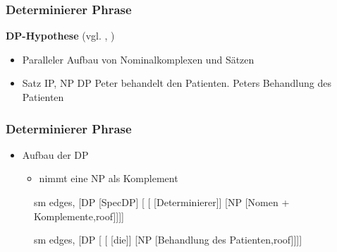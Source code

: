 
\begin{frame}
\frametitle{Determinierer Phrase}

\textbf{DP-Hypothese} (vgl. \citet{Abney87a}, \citet{Brame82a})
		\begin{itemize}
			\item Paralleler Aufbau von Nominalkomplexen und Sätzen
			\item Satz \ras IP, NP \ras DP
			\eal
			\ex Peter behandelt den Patienten.
			\ex Peters Behandlung des Patienten
			\zl
			
		\end{itemize}

\end{frame}


\begin{frame}
\frametitle{Determinierer Phrase}

	\begin{itemize}
		\item Aufbau der DP
		\begin{itemize}
			\item {} nimmt eine NP als Komplement
		\end{itemize}
	\end{itemize}


\begin{figure}[b]
  	\begin{minipage}[b]{0.6\textwidth}
	\centering
	\footnotesize{
		\begin{forest}
		sm edges,
		[DP [SpecDP]
			[ 	[ [Determinierer]]
						[NP [Nomen + Komplemente,roof]]]]
		\end{forest}
		}
  	\end{minipage}  
	\begin{minipage}[b]{0.35\textwidth}
	\centering
	\footnotesize{
		\begin{forest}
		sm edges,
		[DP [ 	[ [die]]
						[NP [Behandlung des Patienten,roof]]]]
		\end{forest}
		}
  	\end{minipage}  
\end{figure}

\end{frame}


